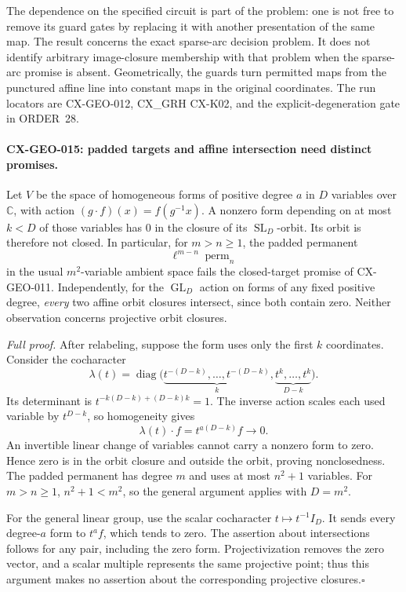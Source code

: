 \documentclass[11pt,a4paper]{article}
\begin{document}
The dependence on the specified circuit is part of the problem:
one is not free to remove its guard gates by replacing it with
another presentation of the same map. The result concerns the
exact sparse-arc decision problem. It does not identify arbitrary
image-closure membership with that problem when the sparse-arc
promise is absent. Geometrically, the guards turn permitted maps
from the punctured affine line into constant maps in the original
coordinates. The run locators are CX-GEO-012, CX\_GRH CX-K02,
and the explicit-degeneration gate in ORDER~28.

\paragraph{CX-GEO-015: padded targets and affine intersection need distinct promises.}
Let $V$ be the space of homogeneous forms of positive degree $a$
in $D$ variables over $\mathbb C$, with action
$(g\cdot f)(x)=f(g^{-1}x)$. A nonzero form depending on at most
$k<D$ of those variables has $0$ in the closure of its
$\operatorname{SL}_D$-orbit. Its orbit is therefore not closed.
In particular, for $m>n\ge1$, the padded permanent
\[
                    \ell^{m-n}\operatorname{perm}_n
\]
in the usual $m^2$-variable ambient space fails the closed-target
promise of CX-GEO-011. Independently, for the
$\operatorname{GL}_D$ action on forms of any fixed positive degree,
\emph{every} two affine orbit closures intersect, since both
contain zero. Neither observation concerns projective orbit closures.

\emph{Full proof.}
After relabeling, suppose the form uses only the first $k$
coordinates. Consider the cocharacter
\[
 \lambda(t)=\operatorname{diag}
   \bigl(\underbrace{t^{-(D-k)},\ldots,t^{-(D-k)}}_{k},
         \underbrace{t^k,\ldots,t^k}_{D-k}\bigr).
\]
Its determinant is
$t^{-k(D-k)+(D-k)k}=1$. The inverse action scales each used
variable by $t^{D-k}$, so homogeneity gives
\[
                 \lambda(t)\cdot f=t^{a(D-k)}f\longrightarrow0.
\]
An invertible linear change of variables cannot carry a nonzero
form to zero. Hence zero is in the orbit closure and outside the
orbit, proving nonclosedness. The padded permanent has degree $m$
and uses at most $n^2+1$ variables. For $m>n\ge1$,
$n^2+1<m^2$, so the general argument applies with $D=m^2$.

For the general linear group, use the scalar cocharacter
$t\mapsto t^{-1}I_D$. It sends every degree-$a$ form to
$t^af$, which tends to zero. The assertion about intersections
follows for any pair, including the zero form. Projectivization
removes the zero vector, and a scalar multiple represents the
same projective point; thus this argument makes no assertion
about the corresponding projective closures.\hfill$\square$
\end{document}
